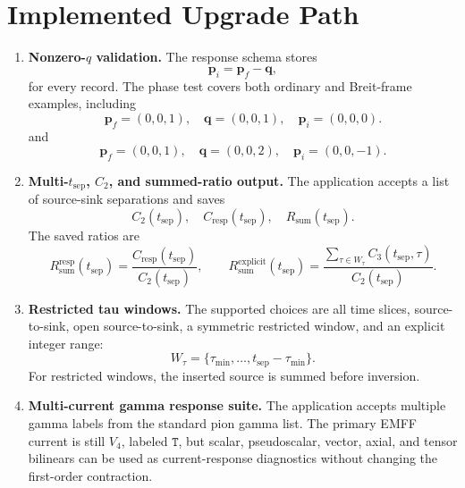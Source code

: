\documentclass[11pt,a4paper]{article}
\newcommand{\Ctwo}{C_2}
\newcommand{\Cthree}{C_3}
\newcommand{\Cresp}{C_{\mathrm{resp}}}
\newcommand{\Rsum}{R_{\mathrm{sum}}}
\begin{document}
\section{Implemented Upgrade Path}

\begin{enumerate}[label=\arabic*.]
  \item \textbf{Nonzero-\(q\) validation.}
  The response schema stores
  \[
    \mathbf p_i = \mathbf p_f - \mathbf q,
  \]
  for every record.  The phase test covers both ordinary and Breit-frame
  examples, including
  \[
    \mathbf p_f=(0,0,1),\quad
    \mathbf q=(0,0,1),\quad
    \mathbf p_i=(0,0,0).
  \]
  and
  \[
    \mathbf p_f=(0,0,1),\quad
    \mathbf q=(0,0,2),\quad
    \mathbf p_i=(0,0,-1).
  \]

  \item \textbf{Multi-\(t_{\mathrm{sep}}\), \(C_2\), and summed-ratio output.}
  The application accepts a list of source-sink separations and saves
  \[
    \Ctwo(t_{\mathrm{sep}}),\quad
    \Cresp(t_{\mathrm{sep}}),\quad
    \Rsum(t_{\mathrm{sep}}).
  \]
  The saved ratios are
  \begin{equation}
    \Rsum^{\mathrm{resp}}(t_{\mathrm{sep}})
      =
      \frac{\Cresp(t_{\mathrm{sep}})}
           {\Ctwo(t_{\mathrm{sep}})},
    \qquad
    \Rsum^{\mathrm{explicit}}(t_{\mathrm{sep}})
      =
      \frac{\sum_{\tau\in W_\tau}\Cthree(t_{\mathrm{sep}},\tau)}
           {\Ctwo(t_{\mathrm{sep}})}.
  \end{equation}

  \item \textbf{Restricted tau windows.}
  The supported choices are all time slices, source-to-sink,
  open source-to-sink, a symmetric restricted window, and an explicit
  integer range:
  \[
    W_\tau=\{\tau_{\min},\ldots,t_{\mathrm{sep}}-\tau_{\min}\}.
  \]
  For restricted windows, the inserted source is summed before inversion.

  \item \textbf{Multi-current gamma response suite.}
  The application accepts multiple gamma labels from the standard pion gamma
  list.  The primary EMFF current is still \(V_4\), labeled \(\texttt{T}\),
  but scalar, pseudoscalar, vector, axial, and tensor bilinears can be used as
  current-response diagnostics without changing the first-order contraction.


\end{enumerate}
\end{document}
